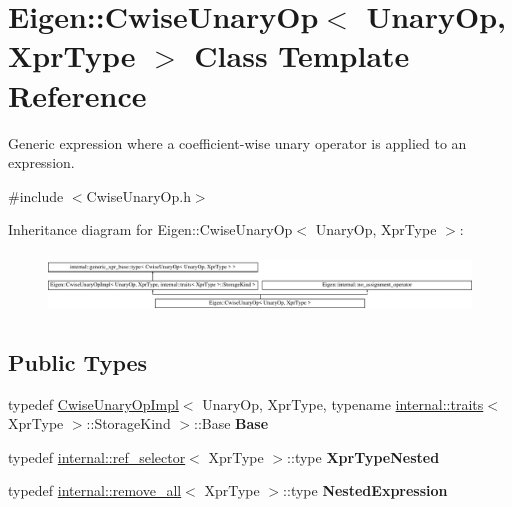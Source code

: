 \hypertarget{class_eigen_1_1_cwise_unary_op}{}\section{Eigen\+::Cwise\+Unary\+Op$<$ Unary\+Op, Xpr\+Type $>$ Class Template Reference}
\label{class_eigen_1_1_cwise_unary_op}


Generic expression where a coefficient-\/wise unary operator is applied to an expression.  




{\ttfamily \#include $<$Cwise\+Unary\+Op.\+h$>$}

Inheritance diagram for Eigen\+::Cwise\+Unary\+Op$<$ Unary\+Op, Xpr\+Type $>$\+:\begin{figure}[H]
\begin{center}
\leavevmode
\includegraphics[height=1.584906cm]{class_eigen_1_1_cwise_unary_op}
\end{center}
\end{figure}
\subsection*{Public Types}
\begin{DoxyCompactItemize}
\item 
\mbox{\label{class_eigen_1_1_cwise_unary_op_a09a0bbb6e2c369dbf58a4444fbfa65c6}} 
typedef \mbox{\hyperlink{class_eigen_1_1_cwise_unary_op_impl}{Cwise\+Unary\+Op\+Impl}}$<$ Unary\+Op, Xpr\+Type, typename \mbox{\hyperlink{struct_eigen_1_1internal_1_1traits}{internal\+::traits}}$<$ Xpr\+Type $>$\+::Storage\+Kind $>$\+::Base {\bfseries Base}
\item 
\mbox{\label{class_eigen_1_1_cwise_unary_op_a70bda63af92ef43a5afafd9a84a8c916}} 
typedef \mbox{\hyperlink{struct_eigen_1_1internal_1_1ref__selector}{internal\+::ref\+\_\+selector}}$<$ Xpr\+Type $>$\+::type {\bfseries Xpr\+Type\+Nested}
\item 
\mbox{\label{class_eigen_1_1_cwise_unary_op_afa95449af34676062a7ea386dd039692}} 
typedef \mbox{\hyperlink{struct_eigen_1_1internal_1_1remove__all}{internal\+::remove\+\_\+all}}$<$ Xpr\+Type $>$\+::type {\bfseries Nested\+Expression}
\end{DoxyCompactItemize}
